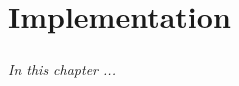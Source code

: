 
    \chapter{Implementation} \label{chap: implementation}

\paragraph{} \textit{In this chapter ...}